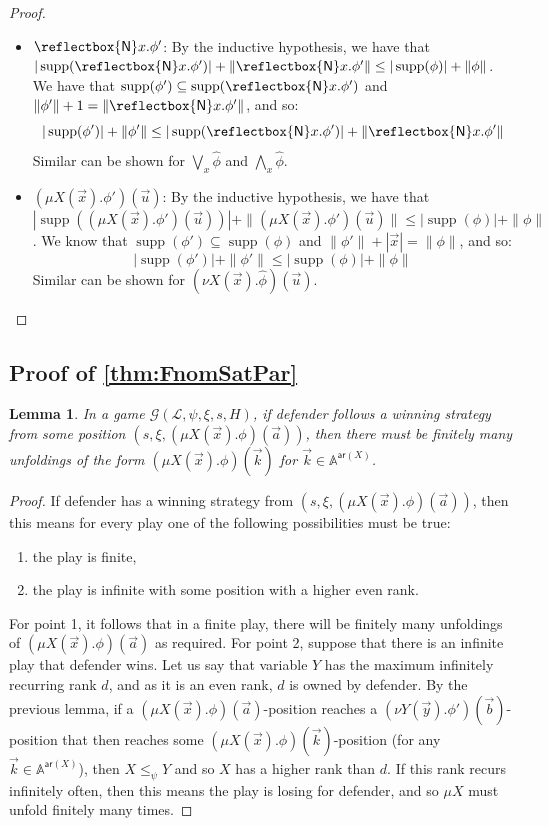 \documentclass[10pt,a4paper]{article}
\newtheorem{lemma}[theorem]{Lemma}
\theoremstyle{definition}
\theoremstyle{remark}
\newcommand\new[0]{\reflectbox{\ensuremath{\mathsf{N}}}}
\newcommand\fresh[1]{\new #1.}
\DeclareMathOperator{\supp}{supp}
\newcommand\Gcal{\mathcal{G}}
\newcommand\Lcal{\mathcal{L}}
\newcommand\Atoms{\mathbb{A}}
\newcommand\ar{\mathsf{ar}}
\begin{document}
\begin{proof}
\begin{enumerate}
\begin{itemize}
						\item $\fresh{x} \phi'$: By the inductive hypothesis, we have that $|\supp(\fresh{x} \phi')| + \|\fresh{x} \phi'\| \le |\supp(\phi)| + \|\phi\|$. 
			We have that $\supp(\phi') \subseteq \supp(\fresh{x} \phi')$ and $\|\phi'\| + 1= \|\fresh{x}\phi' \|$, and so:
			\[
				|\supp(\phi')| + \|\phi'\| \le |\supp(\fresh{x}\phi')| + \|\fresh{x}\phi'\|
			\]
			Similar can be shown for $\bigvee_x \hat \phi$ and $\bigwedge_x \hat \phi$.
						\item $(\mu X(\vec x).\phi')(\vec u)$: By the inductive hypothesis, we have that $|\supp((\mu X(\vec x).\phi')(\vec u))| + \|(\mu X(\vec x).\phi')(\vec u)\| \le |\supp(\phi)| + \|\phi\|$. 
			We know that $\supp(\phi') \subseteq \supp(\phi)$ and $\|\phi'\| + |\vec x| = \|\phi\|$, and so:
			\[
				|\supp(\phi')| + \|\phi'\| \le |\supp(\phi)| + \|\phi\|
			\]
			Similar can be shown for $(\nu X(\vec x).\hat \phi)(\vec u)$.
		\end{itemize}
	\end{enumerate}
\end{proof}

\subsection{Proof of \cref{thm:FnomSatPar}}

\begin{lemma}\label{lem:parityNom}
	In a game $\Gcal(\Lcal, \psi, \xi, s, H)$, if defender follows a winning strategy from some position $(s, \xi, (\mu X(\vec x).\phi)(\vec a))$,
	then there must be finitely many unfoldings of the form $(\mu X(\vec x).\phi)(\vec k)$ for $\vec k \in \Atoms^{\ar(X)}$. 
\end{lemma}
\begin{proof}
	If defender has a winning strategy from $(s, \xi, (\mu X(\vec x).\phi)(\vec a))$, then this means for every play one of the following possibilities must be true:
	\begin{enumerate}
		\item the play is finite,
		\item the play is infinite with some position with a higher even rank.
	\end{enumerate}
	For point 1, it follows that in a finite play, there will be finitely many unfoldings of $(\mu X(\vec x).\phi)(\vec a)$ as required.
	For point 2, suppose that there is an infinite play that defender wins.
	Let us say that variable $Y$ has the maximum infinitely recurring rank $d$, and as it is an even rank, $d$ is owned by defender.
	By the previous lemma, if a $(\mu X(\vec x).\phi)(\vec a)$-position reaches a $(\nu Y(\vec y).\phi')(\vec b)$-position that then reaches some $(\mu X(\vec x).\phi)(\vec k)$-position (for any $\vec k \in \Atoms^{\ar(X)}$), then $X \le_\psi Y$ and so $X$ has a higher rank than $d$.
	If this rank recurs infinitely often, then this means the play is losing for defender, and so $\mu X$ must unfold finitely many times.
\end{proof}
\end{document}
